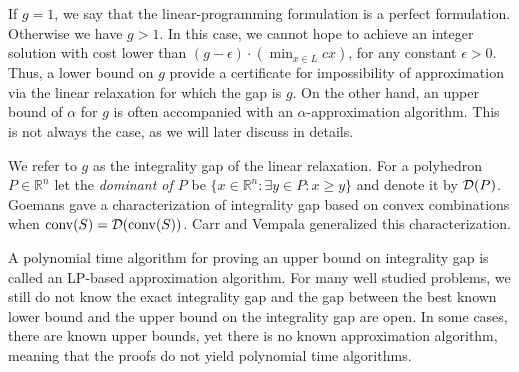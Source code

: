 {\vspace*{5pt}
\noindent{}
\vspace*{3pt}

If $g=1$, we say that the linear-programming formulation is a perfect formulation. Otherwise we have $g>1$. In this case, we cannot hope to achieve an integer solution with cost lower than $(g-\epsilon)\cdot (\min_{x\in L}cx)$, for any constant $\epsilon>0$. Thus, a lower bound on $g$ provide a certificate for impossibility of approximation via the linear relaxation for which the gap is $g$. On the other hand, an upper bound of $\alpha$ for $g$ is often accompanied with an $\alpha$-approximation algorithm. This is not always the case, as we will later discuss in details.

We refer to $g$ as the integrality gap of the linear relaxation. For a polyhedron $P\in \mathbb{R}^n$ let the \textit{dominant of $P$} be $\{x\in \mathbb{R}^n: \exists y \in P: x\geq y\}$ and denote it by $\operatorname{\mathcal{D}}(P)$. Goemans \cite{goemansblocking} gave a characterization of integrality gap based on convex combinations when $\operatorname{conv}(S)=\mathcal{D}(\operatorname{conv}(S))$. Carr and Vempala \cite{Carr2004} generalized this characterization.


\vspace*{5pt}
\noindent{}
\vspace*{5pt}




A polynomial time algorithm for proving an upper bound on integrality gap is called an LP-based approximation algorithm. For many well studied problems, we still do not know the exact integrality gap and the gap between the best known lower bound and the upper bound on the integrality gap are open. In some cases, there are known upper bounds, yet there is no known approximation algorithm, meaning that the proofs do not yield polynomial time algorithms.
}\fi 
